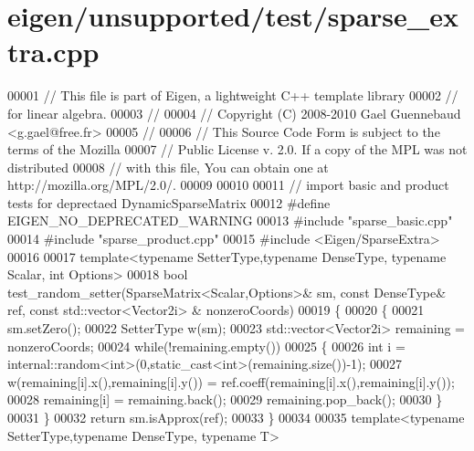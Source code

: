 \hypertarget{eigen_2unsupported_2test_2sparse__extra_8cpp_source}{}\section{eigen/unsupported/test/sparse\+\_\+extra.cpp}
\label{eigen_2unsupported_2test_2sparse__extra_8cpp_source}

\begin{DoxyCode}
00001 \textcolor{comment}{// This file is part of Eigen, a lightweight C++ template library}
00002 \textcolor{comment}{// for linear algebra.}
00003 \textcolor{comment}{//}
00004 \textcolor{comment}{// Copyright (C) 2008-2010 Gael Guennebaud <g.gael@free.fr>}
00005 \textcolor{comment}{//}
00006 \textcolor{comment}{// This Source Code Form is subject to the terms of the Mozilla}
00007 \textcolor{comment}{// Public License v. 2.0. If a copy of the MPL was not distributed}
00008 \textcolor{comment}{// with this file, You can obtain one at http://mozilla.org/MPL/2.0/.}
00009 
00010 
00011 \textcolor{comment}{// import basic and product tests for deprectaed DynamicSparseMatrix}
00012 \textcolor{preprocessor}{#define EIGEN\_NO\_DEPRECATED\_WARNING}
00013 \textcolor{preprocessor}{#include "sparse\_basic.cpp"}
00014 \textcolor{preprocessor}{#include "sparse\_product.cpp"}
00015 \textcolor{preprocessor}{#include <Eigen/SparseExtra>}
00016 
00017 \textcolor{keyword}{template}<\textcolor{keyword}{typename} SetterType,\textcolor{keyword}{typename} DenseType, \textcolor{keyword}{typename} Scalar, \textcolor{keywordtype}{int} Options>
00018 \textcolor{keywordtype}{bool} test\_random\_setter(SparseMatrix<Scalar,Options>& sm, \textcolor{keyword}{const} DenseType& ref, \textcolor{keyword}{const} std::vector<Vector2i>
      & nonzeroCoords)
00019 \{
00020   \{
00021     sm.setZero();
00022     SetterType w(sm);
00023     std::vector<Vector2i> remaining = nonzeroCoords;
00024     \textcolor{keywordflow}{while}(!remaining.empty())
00025     \{
00026       \textcolor{keywordtype}{int} i = internal::random<int>(0,\textcolor{keyword}{static\_cast<}\textcolor{keywordtype}{int}\textcolor{keyword}{>}(remaining.size())-1);
00027       w(remaining[i].x(),remaining[i].y()) = ref.coeff(remaining[i].x(),remaining[i].y());
00028       remaining[i] = remaining.back();
00029       remaining.pop\_back();
00030     \}
00031   \}
00032   \textcolor{keywordflow}{return} sm.isApprox(ref);
00033 \}
00034 
00035 \textcolor{keyword}{template}<\textcolor{keyword}{typename} SetterType,\textcolor{keyword}{typename} DenseType, \textcolor{keyword}{typename} T>

\end{DoxyCode}
